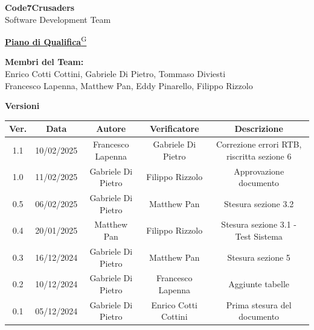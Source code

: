 \documentclass{article}
\begin{document}
\begin{titlepage}
    {\Huge \textbf{Code7Crusaders}}\\
    \vspace{0.5cm}
    {\Large Software Development Team}\\
    \vspace{2cm}
    
    {\large \href{https://code7crusaders.github.io/docs/PB/documentazione_interna/glossario.html#piano-di-progetto}{\textbf{Piano di Qualifica}\textsuperscript{G}}}\\
    \vspace{5cm}
    
    
    \textbf{Membri del Team:}\\
    Enrico Cotti Cottini, Gabriele Di Pietro, Tommaso Diviesti \\
    Francesco Lapenna, Matthew Pan, Eddy Pinarello, Filippo Rizzolo \\
    \vspace{0.5cm}
    
    \vspace{1cm}
\end{titlepage}



\begin{table}[h!]
\centering
\textbf{Versioni} \\ %
\vspace{2mm} %
\begin{tabular}{|c|c|c|c|c|}
    \hline
    \textbf{Ver.} & \textbf{Data} & \textbf{Autore} & \textbf{Verificatore} & \textbf{Descrizione} \\
    \hline
    1.1 & 10/02/2025 & Francesco Lapenna & Gabriele Di Pietro & Correzione errori RTB, riscritta sezione 6 \\
    1.0 & 11/02/2025 & Gabriele Di Pietro & Filippo Rizzolo & Approvazione documento \\
    0.5 & 06/02/2025 & Gabriele Di Pietro & Matthew Pan & Stesura sezione 3.2 \\
    0.4 & 20/01/2025 & Matthew Pan & Filippo Rizzolo & Stesura sezione 3.1 - Test Sistema \\
    0.3 & 16/12/2024 & Gabriele Di Pietro & Matthew Pan & Stesura sezione 5 \\
    0.2 & 10/12/2024 & Gabriele Di Pietro & Francesco Lapenna & Aggiunte tabelle \\
    0.1 & 05/12/2024 & Gabriele Di Pietro & Enrico Cotti Cottini & Prima stesura del documento \\  
    \hline
\end{tabular}
\label{tab:versioni}
\end{table}
\newpage
\end{document}
